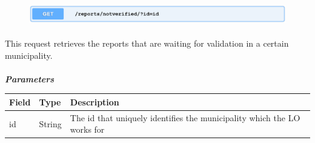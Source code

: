 						\clearpage
						\begin{figure}[!h]
							\includegraphics[width=\textwidth]{images/Restful/ToValidate}
						\end{figure}
						\paragraph{}
						\vspace{-7.5mm}
						This request retrieves the reports that are waiting for validation in a certain municipality.
						\paragraph{}
							\textcolor{myBlue}{\textit{\textbf{Parameters}}}
							\vspace{-2mm}
							\begin{table}[!h]
								\begin{tabular}{L{0.15\textwidth}L{0.15\textwidth}L{0.58\textwidth}}
									\toprule
									\textbf{Field} & \textbf{Type} & \textbf{Description} \\
									\midrule
								 	id & String & The id that uniquely identifies the municipality which the LO works for \\
								 	\bottomrule
								\end{tabular}
							\end{table}
